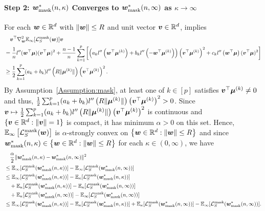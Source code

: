 \paragraph{Step 2: $\wmask$  Converges to $\wmask[\infty]$ as $\kappa \rightarrow \infty$} \quad

For each $\vw \in \mathbb{R}^d$ with $\lVert \vw \rVert \leq R$ and unit vector $\vv \in \mathbb{R}^d$,   implies
\begin{align*}
 &\quad \vv^\top \nabla_\vw^2 \mathbb{E}_\infty[\lossmask (\vw) ]\vv \\
 &= \frac{1}{n} l''(\vw^\top \vmu) (\vv^\top \vmu)^2 + \frac{n-1}{n} \sum_{k=1}^p \left[ \left(a_k l''\left(\vw^\top \vmu^{(k)}\right) + b_k l''\left(-\vw^\top \vmu^{(k)}\right)\right) \left(\vv^\top \vmu^{(k)}\right)^2 + c_k l''\left(\vw^\top \vmu \right)(\vv^\top \vmu)^2 \right]\\
 &\geq \frac{1}{2} \sum_{k=1}^p (a_k + b_k) l''\left (R\lVert \vmu^{(k)}\rVert \right) \left(\vv^\top \vmu^{(k)} \right)^2.
\end{align*}
By Assumption~\ref{Assumption:mask}, at least one of $k\in[p]$ satisfies $\vv^\top \vmu^{(k)} \neq 0$ and thus, $\frac{1}{2} \sum_{k=1}^p (a_k + b_k) l''\left ( R\lVert \vmu^{(k)}\rVert \right) \left(\vv^\top \vmu^{(k)} \right)^2 >0$. Since $\vv \mapsto \frac{1}{2} \sum_{k=1}^p (a_k + b_k) l''\left ( R\lVert \vmu^{(k)}\rVert \right) \left(\vv^\top \vmu^{(k)} \right)^2$ is continuous and $\{ \vv \in \mathbb{R}^d:\lVert \vv\rVert=1 \}$ is compact, it has minimum $\alpha>0$ on this set. Hence, $\mathbb{E}_\infty \left[ \lossmask (\vw)\right]$ is $\alpha$-strongly convex on $\left \{\vw\in \mathbb{R}^d : \lVert \vw \rVert \leq R \right \}$ and since $\wmask \in \left \{\vw\in \mathbb{R}^d : \lVert \vw \rVert \leq R \right \}$ for each $\kappa \in (0,\infty)$, we have
\begin{align*}
&\quad \frac{\alpha}{2} \lVert \wmask - \wmask[\infty]\rVert^2\\
&\leq \mathbb{E}_\infty[\lossmask (\wmask)] - \mathbb{E}_\infty[\lossmask (\wmask[\infty])]\\
&\leq \mathbb{E}_\infty[\lossmask (\wmask)] - \mathbb{E}_\kappa[\lossmask (\wmask)]\\
&\quad + \mathbb{E}_\kappa[\lossmask (\wmask)] - \mathbb{E}_\kappa[\lossmask (\wmask[\infty])]\\
&\quad +\mathbb{E}_\kappa[\lossmask (\wmask[\infty])] - \mathbb{E}_\infty[\lossmask (\wmask[\infty])]\\
&\leq \mathbb{E}_\infty[\lossmask (\wmask)] - \mathbb{E}_\kappa[\lossmask (\wmask)]+\mathbb{E}_\kappa[\lossmask (\wmask[\infty])] - \mathbb{E}_\infty[\lossmask (\wmask[\infty])].
\end{align*}
